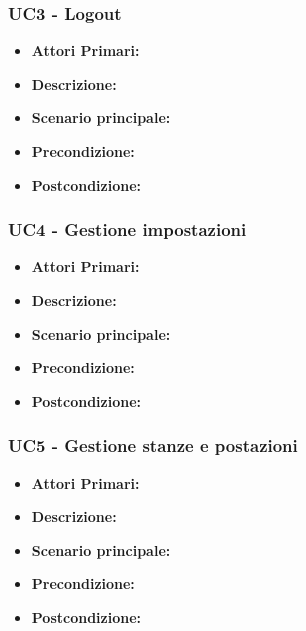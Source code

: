 \subsubsection{ UC3 - Logout}
\begin{itemize}
           	\item\textbf{Attori Primari:} 
           	\item\textbf{Descrizione:} 
           	\item\textbf{Scenario principale:} 
           	\item\textbf{Precondizione:} 
           	\item\textbf{Postcondizione:}
\end{itemize}

\subsubsection{ UC4 - Gestione impostazioni}
\begin{itemize}
           	\item\textbf{Attori Primari:} 
           	\item\textbf{Descrizione:} 
           	\item\textbf{Scenario principale:} 
           	\item\textbf{Precondizione:} 
           	\item\textbf{Postcondizione:}
\end{itemize}

\subsubsection{ UC5 - Gestione stanze e postazioni}
\begin{itemize}
           	\item\textbf{Attori Primari:} 
           	\item\textbf{Descrizione:} 
           	\item\textbf{Scenario principale:} 
           	\item\textbf{Precondizione:} 
           	\item\textbf{Postcondizione:}
\end{itemize}
